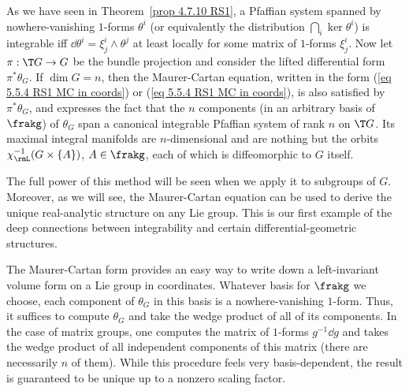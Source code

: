 \begin{rem}
    As we have seen  in Theorem~\ref{prop 4.7.10 RS1}, a Pfaffian system spanned by nowhere-vanishing $1$-forms $\theta^i$ (or equivalently the distribution $\bigcap_i\ker\theta^i$) is integrable iff $\dd \theta^i=\xi^i_j\wedge\theta^j$ at least locally for some matrix of $1$-forms $\xi^i_j$. Now let $\pi:\T G\to G$ be the bundle projection and consider the lifted differential form $\pi^\ast\theta_G$. If $\dim G=n$, then the Maurer-Cartan equation, written in the form (\ref{eq 5.5.4 RS1 MC in coords}) or (\ref{eq 5.5.4 RS1 MC in coords}), is also satisfied by $\pi^\ast\theta_G$, and expresses the fact that the $n$ components (in an arbitrary basis of $\frakg$) of $\theta_G$ span a canonical integrable Pfaffian system of rank $n$ on $\T G$. Its maximal integral manifolds are $n$-dimensional and are nothing but the orbits $\chi_\rmL^{-1}(G\times \{A\})$, $A\in\frakg$, each of which is diffeomorphic to $G$ itself. 
    
    The full power of this method will be seen when we apply it to subgroups of $G$. Moreover, as we will see, the Maurer-Cartan equation can be used to derive the unique real-analytic structure on any Lie group. This is our first example of the deep connections between integrability and certain differential-geometric structures.
\end{rem}

\begin{rem}
    The Maurer-Cartan form provides an easy way to write down a left-invariant volume form on a Lie group in coordinates. Whatever basis for $\frakg$ we choose, each component of $\theta_G$ in this basis is a nowhere-vanishing $1$-form. Thus, it suffices to compute $\theta_G$ and take the wedge product of all of its components. In the case of matrix groups, one computes the matrix of $1$-forms $g^{-1}\dd g$ and takes the wedge product of all independent components of this matrix (there are necessarily $n$ of them). While this procedure feels very basis-dependent, the result is guaranteed to be unique up to a nonzero scaling factor.
\end{rem}


